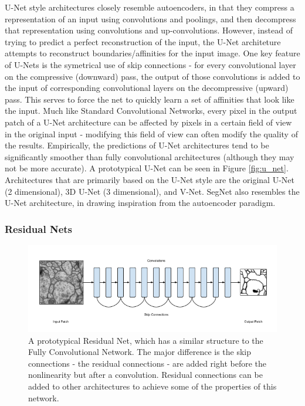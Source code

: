 U-Net style architectures closely resemble autoencoders, in that they compress a representation of an input using convolutions and poolings, and then decompress that representation using convolutions and up-convolutions.  However, instead of trying to predict a perfect reconstruction of the input, the U-Net architeture attempts to reconstruct boundaries/affinities for the input image. One key feature of U-Nets is the symetrical use of skip connections - for every convolutional layer on the compressive (downward) pass, the output of those convolutions is added to the input of corresponding convolutional layers on the decompressive (upward) pass. This serves to force the net to quickly learn a set of affinities that look like the input. Much like Standard Convolutional Networks, every pixel in the output patch of a U-Net architecture can be affected by pixels in a certain field of view in the original input - modifying this field of view can often modify the quality of the results. Empirically, the predictions of U-Net architectures tend to be significantly smoother than fully convolutional architectures (although they may not be more accurate). A prototypical U-Net can be seen in Figure \ref{fig:u_net}. Architectures that are primarily based on the U-Net style are the original U-Net (2 dimensional), 3D U-Net (3 dimensional), and V-Net. SegNet also resembles the U-Net architecture, in drawing inspiration from the autoencoder paradigm\cite{Ronneberger2015,Cicek2016,Milletari2016,Badrinarayanan2015}.

\subsubsection{Residual Nets}

\begin{figure}
\centering
\includegraphics[width=\textwidth]{img/Residual_Network.png}
\caption[A prototypical Residual Net]{A prototypical Residual Net, which has a similar structure to the Fully Convolutional Network. The major difference is the skip connections - the residual connections - are added right before the nonlinearity but after a convolution. Residual connections can be added to other architectures to achieve some of the properties of this network.}
\label{fig:residual_net}
\end{figure}

